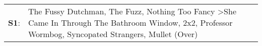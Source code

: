\begin{supertabular}{p{0.03\textwidth}p{0.92\textwidth}}
 \textbf{S1}:  &  The Fussy Dutchman\textsuperscript{}, \enspace The Fuzz\textsuperscript{}, \enspace Nothing Too Fancy\textsuperscript{} \textgreater \enspace She Came In Through The Bathroom Window\textsuperscript{}, \enspace 2x2\textsuperscript{}, \enspace Professor Wormbog\textsuperscript{}, \enspace Syncopated Strangers\textsuperscript{}, \enspace Mullet (Over)\textsuperscript{}  \enspace  \\
\end{supertabular}
